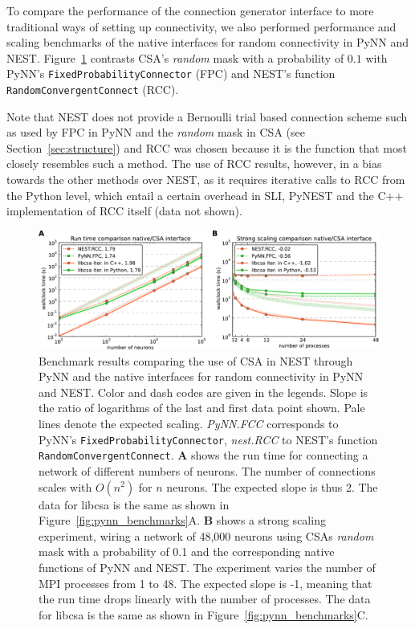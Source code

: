 \documentclass{frontiersSCNS} %
\newcommand{\INLINEFIGS}{} %
\newcommand{\Figure}[2]{Figure~\ref{#2}}
\newcommand{\Figure}[2]{Figure~#1}
\begin{document}
To compare the performance of the connection generator interface to
more traditional ways of setting up connectivity, we also performed
performance and scaling benchmarks of the native interfaces for random
connectivity in PyNN and NEST. \Figure{5}{fig:native_benchmarks}
contrasts CSA's \emph{random} mask with a probability of $0.1$ with
PyNN's \verb|FixedProbabilityConnector| (FPC) and NEST's function
\verb|RandomConvergentConnect| (RCC).

Note that NEST does not provide a Bernoulli trial based connection
scheme such as used by FPC in PyNN and the \emph{random} mask in CSA
(see Section~\ref{sec:structure}) and RCC was chosen because it is the
function that most closely resembles such a method. The use of RCC results,
however, in a bias towards the other methods over NEST, as it requires
iterative calls to RCC from the Python level, which entail a certain
overhead in SLI, PyNEST and the C++ implementation of RCC itself (data
not shown).

\ifdefined\INLINEFIGS
\begin{figure}[ht]
\centering
\includegraphics[scale=.7]{benchmarks/native_routines.pdf}
\caption{Benchmark results comparing the use of CSA in NEST through
  PyNN and the native interfaces for random connectivity in PyNN and
  NEST. Color and dash codes are given in the legends. Slope is the
  ratio of logarithms of the last and first data point shown. Pale
  lines denote the expected scaling. \emph{PyNN.FCC} corresponds to
  PyNN's \texttt{FixedProbabilityConnector}, \emph{nest.RCC} to NEST's
  function \texttt{RandomConvergentConnect}. \textbf{A} shows the run
  time for connecting a network of different numbers of neurons. The
  number of connections scales with $O(n^2)$ for $n$ neurons. The
  expected slope is thus 2. The data for libcsa is the same as shown
  in \Figure{4}{fig:pynn_benchmarks}A. \textbf{B} shows a strong
  scaling experiment, wiring a network of 48,000 neurons using CSAs
  \emph{random} mask with a probability of 0.1 and the corresponding
  native functions of PyNN and NEST. The experiment varies the number
  of MPI processes from 1 to 48. The expected slope is -1, meaning
  that the run time drops linearly with the number of processes. The
  data for libcsa is the same as shown in
  \Figure{4}{fig:pynn_benchmarks}C.}\label{fig:native_benchmarks}
\end{figure}
\fi
\end{document}
